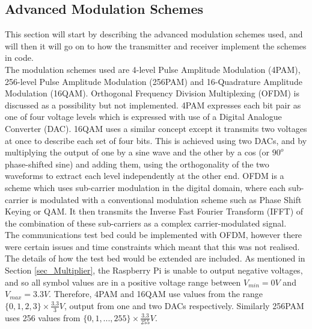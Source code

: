 \documentclass[../main.tex]{subfiles}
\begin{document}
\subsection{Advanced Modulation Schemes} \label{sec_Advanced Modulation Schemes}


This section will start by describing the advanced modulation schemes used, and will then it will go on to how the transmitter and receiver implement  the schemes in code.\\

The modulation schemes used are 4-level Pulse Amplitude Modulation (4PAM), 256-level Pulse Amplitude Modulation (256PAM) and 16-Quadrature Amplitude Modulation (16QAM).
Orthogonal Frequency Division Multiplexing (OFDM) is discussed as a possibility but not implemented.
4PAM expresses each bit pair as one of four voltage levels which is expressed with use of a Digital Analogue Converter (DAC).
16QAM uses a similar concept except it transmits two voltages at once to describe each set of four bits.
This is achieved using two DACs, and by multiplying the output of one by a sine wave and the other by a cos (or $90^o$ phase-shifted sine) and adding them, using the orthogonality of the two waveforms to extract each level independently at the other end.
OFDM is a scheme which uses sub-carrier modulation in the digital domain, where each sub-carrier is modulated with a conventional modulation scheme such as Phase Shift Keying or QAM.
It then transmits the Inverse Fast Fourier Transform (IFFT) of the combination of these sub-carriers as a complex carrier-modulated signal.\\

The communications test bed could be implemented with OFDM, however there were certain issues and time constraints which meant that this was not realised.
The details of how the test bed would be extended are included.
As mentioned in Section \ref{sec_Multiplier}, the Raspberry Pi is unable to output negative voltages, and so all symbol values are in a positive voltage range between $V_{min} = 0V$ and $V_{max} = 3.3V$.
Therefore, 4PAM and 16QAM use values from the range $\{0, 1, 2, 3\} \times \frac{3.3}{3}V$, output from one and two DACs respectively.
Similarly 256PAM uses 256 values from $\{0, 1, ..., 255\} \times \frac{3.3}{255}V$.\\

\newpage
\end{document}
